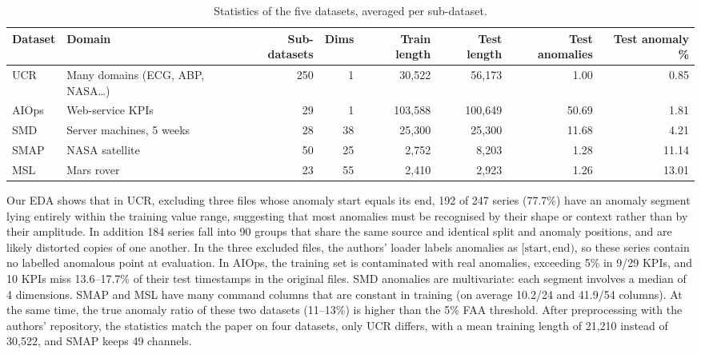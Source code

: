 \documentclass[sigconf,nonacm]{acmart}
\begin{document}
\begin{table}[t]
\centering
\small
\caption{Statistics of the five datasets, averaged per sub-dataset.}
\label{tab:dataset_stats}
\setlength{\tabcolsep}{6pt}
\begin{tabularx}{\textwidth}{@{}lXrrrrrr@{}}
\toprule
\textbf{Dataset} & \textbf{Domain} & \textbf{Sub-datasets} & \textbf{Dims} & \textbf{Train length} & \textbf{Test length} & \textbf{Test anomalies} & \textbf{Test anomaly \%} \\
\midrule
UCR   & Many domains (ECG, ABP, NASA\dots) & 250 & 1  & 30,522  & 56,173  & 1.00  & 0.85  \\
AIOps & Web-service KPIs                   & 29  & 1  & 103,588 & 100,649 & 50.69 & 1.81  \\
SMD   & Server machines, 5 weeks           & 28  & 38 & 25,300  & 25,300  & 11.68 & 4.21  \\
SMAP  & NASA satellite                     & 50  & 25 & 2,752   & 8,203   & 1.28  & 11.14 \\
MSL   & Mars rover                         & 23  & 55 & 2,410   & 2,923   & 1.26  & 13.01 \\
\bottomrule
\end{tabularx}
\end{table}

Our EDA shows that in UCR, excluding three files whose anomaly start equals its end, 192 of 247 series (77.7\%) have an anomaly segment lying entirely within the training value range, suggesting that most anomalies must be recognised by their shape or context rather than by their amplitude. In addition 184 series fall into 90 groups that share the same source and identical split and anomaly positions, and are likely distorted copies of one another. In the three excluded files, the authors' loader labels anomalies as $[\text{start}, \text{end})$, so these series contain no labelled anomalous point at evaluation. In AIOps, the training set is contaminated with real anomalies, exceeding 5\% in 9/29 KPIs, and 10 KPIs miss 13.6--17.7\% of their test timestamps in the original files. SMD anomalies are multivariate: each segment involves a median of 4 dimensions. SMAP and MSL have many command columns that are constant in training (on average 10.2/24 and 41.9/54 columns). At the same time, the true anomaly ratio of these two datasets (11--13\%) is higher than the 5\% FAA threshold. After preprocessing with the authors' repository, the statistics match the paper on four datasets, only UCR differs, with a mean training length of 21,210 instead of 30,522, and SMAP keeps 49 channels.
\end{document}
